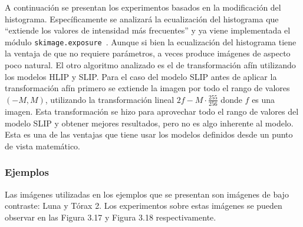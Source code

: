 A continuaci\'on se presentan los experimentos basados en la modificaci\'on del histograma. Espec\'ificamente se analizar\'a la ecualizaci\'on del histograma que ``extiende los valores de intensidad más frecuentes'' y ya viene implementada el m\'odulo \verb|skimage.exposure|~\cite{histogram_equalization}. Aunque si bien la ecualización del histograma tiene la ventaja de que no requiere parámetros, a veces produce imágenes de aspecto poco natural. El otro algoritmo analizado es el de transformaci\'on af\'in utilizando los modelos HLIP y SLIP. Para el caso del modelo SLIP antes de aplicar la transformaci\'on af\'in primero se extiende la imagen por todo el rango de valores $(-M,M)$, utilizando la transformaci\'on lineal $2f-M\cdot\frac{255}{256}$ donde $f$ es una imagen. Esta transformaci\'on se hizo para aprovechar todo el rango de valores del modelo SLIP y obtener mejores resultados, pero no es algo inherente al modelo. Esta es una de las ventajas que tiene usar los modelos definidos desde un punto de vista matem\'atico. 

\subsubsection{Ejemplos}

Las im\'agenes utilizadas en los ejemplos que se presentan son im\'agenes de bajo contraste: Luna y T\'orax 2. Los experimentos sobre estas im\'agenes se pueden observar en las Figura 3.17 y Figura 3.18 respectivamente.

